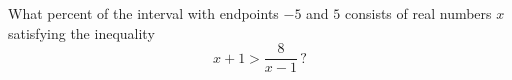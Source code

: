 What percent of the interval with endpoints $-5$ and $5$ consists of real numbers $x$ satisfying the inequality
\[x+1>\dfrac{8}{x-1}\,?\]
